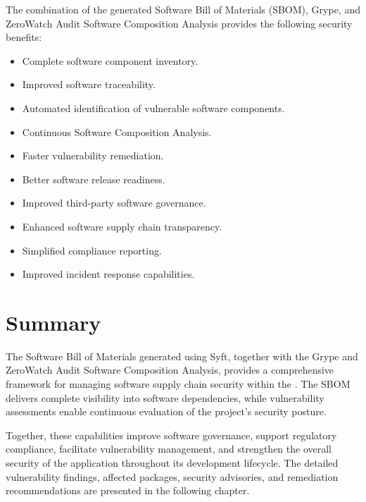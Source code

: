 The combination of the generated Software Bill of Materials (SBOM), Grype, and ZeroWatch Audit Software Composition Analysis provides the following security benefits:
\begin{itemize}
\item Complete software component inventory.
\item Improved software traceability.
\item Automated identification of vulnerable software components.
\item Continuous Software Composition Analysis.
\item Faster vulnerability remediation.
\item Better software release readiness.
\item Improved third-party software governance.
\item Enhanced software supply chain transparency.
\item Simplified compliance reporting.
\item Improved incident response capabilities.
\end{itemize}

\vspace{0.4cm}


\section{Summary}

The Software Bill of Materials generated using Syft, together with the Grype and ZeroWatch Audit Software Composition Analysis, provides a comprehensive framework for managing software supply chain security within the \ProjectName. The SBOM delivers complete visibility into software dependencies, while vulnerability assessments enable continuous evaluation of the project's security posture.

Together, these capabilities improve software governance, support regulatory compliance, facilitate vulnerability management, and strengthen the overall security of the application throughout its development lifecycle. The detailed vulnerability findings, affected packages, security advisories, and remediation recommendations are presented in the following chapter.